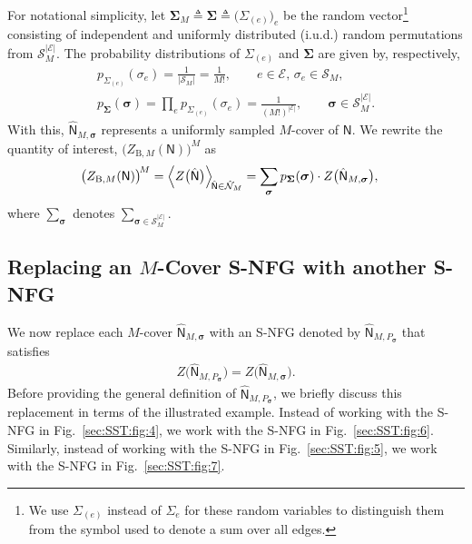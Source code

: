 \documentclass[journal]{IEEEtran}
\newcommand{\add}[1]{{\color{black}#1}}
\newcommand{\vect}[1]{ \bm{#1} }
\newcommand{\set}[1]{\mathcal{#1}}
\newcommand{\setEfull}{ \mathcal{E} }
\newcommand{\graphN}{ \mathsf{N} }
\newcommand{\defeq}{ \triangleq }
\newcommand{\ZBM}{ Z_{\mathrm{B},M} }
\newcommand{\hgraphN}{ \hat{\graphN} }
\newcommand{\Sigmae}{\Sigma_{(e)}}
\newcommand{\vsigma}{\vect{\sigma}}
\newcommand{\vSigma}{\vect{\Sigma}}
\newcommand{\hgraphPsig}{ \hgraphN_{M,P_{\vsigma}} }
\begin{document}
\add{For notational simplicity, let $\vSigma_{M} \defeq \vSigma \defeq \bigl( \Sigmae \bigr)_{e}$ be the random vector}\footnote{We use $\Sigmae$ instead of $\Sigma_e$ for these random
  variables \add{to} distinguish them from the symbol used to denote a sum
  over all edges.} consisting of
independent and uniformly distributed (i.u.d.) random permutations from
$\set{S}_M^{|\setEfull|}$. The probability distributions of $ \Sigmae $ and $ \vSigma $ are given by, respectively,
\begin{align}
  p_{\Sigmae}(\sigma_e) = \frac{1}{|\set{S}_M|} = \frac{1}{M!}, \qquad e \in \setEfull,\,
  \sigma_e \in \set{S}_M, \label{sec:sst:eqn:31:pre:1} \\
  p_{\vSigma}(\vsigma) = \prod_{e}p_{\Sigmae}(\sigma_e)
  = \frac{1}{(M!)^{|\setEfull|}}, \qquad
  \vsigma \in \set{S}_M^{|\setEfull|}
  .\label{sec:sst:eqn:31}
\end{align}
With this, $\hgraphN_{M,\vsigma}$ represents a uniformly
sampled $M$-cover of $\graphN$. We rewrite the quantity of interest,
$\bigl( \ZBM(\graphN) \bigr)^{\! M}$ as
\begin{align}
  \bigl( \ZBM(\graphN) \bigr)^{\! M}
   & = \Bigl\langle
  Z\bigl( \hgraphN \bigr)
  \Bigr\rangle_{ \! \hgraphN \in \hat{\set{N}}_{M}}
  = \sum_{\vsigma}
  p_{\vSigma}(\vsigma)
  \cdot
  Z\bigl( \hgraphN_{M,\vsigma} \bigr), \label{sec:sst:eqn:15}
\end{align}
where $ \sum_{\vsigma} $ denotes $ \sum_{\vsigma \in \set{S}_M^{|\setEfull|}} $.

\subsection{Replacing an \texorpdfstring{$M$}{}-Cover S-NFG
  with another S-NFG}

\add{We now replace each $M$-cover $\hgraphN_{M,\vsigma}$ with an S-NFG
  denoted by $\hgraphPsig$ that satisfies}
\begin{align}
  Z\bigl( \hgraphPsig \bigr)
  = Z\bigl( \hgraphN_{M,\vsigma} \bigr). \label{sec:sst:eqn:33}
\end{align}
Before providing the general definition of $\hgraphPsig$, we briefly
discuss this replacement in terms of the illustrated example. Instead
of working with the S-NFG in Fig.~\ref{sec:SST:fig:4}, \add{we}
work with the S-NFG in Fig.~\ref{sec:SST:fig:6}. Similarly,
instead of working with the S-NFG in
Fig.~\ref{sec:SST:fig:5}, \add{we work with the S-NFG in}
Fig.~\ref{sec:SST:fig:7}.
\end{document}
